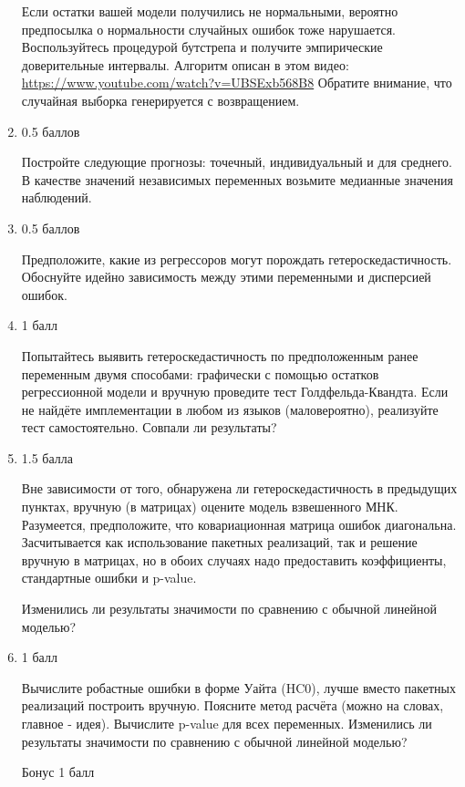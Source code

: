 \documentclass[a4paper,12pt]{article}
\begin{document}
\begin{enumerate}
		  Если остатки вашей модели получились не нормальными, вероятно предпосылка о нормальности случайных ошибок тоже нарушается. Воспользуйтесь процедурой бутстрепа и получите эмпирические доверительные интервалы.
		 Алгоритм описан в этом видео:
		 \href{https://www.youtube.com/watch?v=UBSExb568B8}{https://www.youtube.com/watch?v=UBSExb568B8} Обратите внимание, что случайная выборка генерируется с возвращением.
		
		
		\item 0.5 баллов
		
		 Постройте следующие прогнозы: точечный, индивидуальный и для среднего. В качестве значений независимых переменных возьмите медианные значения наблюдений.
		
		\item 0.5 баллов
		
		Предположите, какие из регрессоров могут порождать гетероскедастичность. Обоснуйте идейно зависимость между этими переменными и дисперсией ошибок.
		
		\item 1 балл
		
		 Попытайтесь выявить гетероскедастичность по предположенным ранее переменным двумя способами: графически с помощью остатков регрессионной модели и вручную проведите тест Голдфельда-Квандта. Если не найдёте имплементации в любом из языков (маловероятно), реализуйте тест самостоятельно. Совпали ли результаты?
		
		\item 1.5 балла
		
		 Вне зависимости от того, обнаружена ли гетероскедастичность в предыдущих пунктах, вручную (в матрицах) оцените модель взвешенного МНК. Разумеется, предположите, что ковариационная матрица ошибок диагональна. Засчитывается как использование пакетных реализаций, так и решение вручную в матрицах, но в обоих случаях надо предоставить коэффициенты, стандартные ошибки и p-value.
		 
		Изменились ли результаты значимости по сравнению с обычной линейной моделью?
		
		\item 1 балл
		
		 Вычислите робастные ошибки в форме Уайта (HC0), лучше вместо пакетных реализаций построить вручную. Поясните метод расчёта (можно на словах, главное - идея). Вычислите p-value для всех переменных. Изменились ли результаты значимости по сравнению с обычной линейной моделью?
		 
		 Бонус 1 балл
		 

\end{enumerate}
\end{document}
